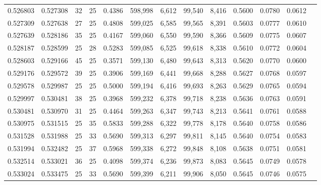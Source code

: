 \begin{tabular}{rrrrrrrrrrrrr}
0.526803 & 0.527308 &    32 &  25 &                                     0.4386 & 598,998 &   6,612 &  99,540 &   8,416 & 0.5600 & 0.0780 & 0.0612 \\
0.527309 & 0.527638 &    27 &  25 &                                     0.4808 & 599,025 &   6,585 &  99,565 &   8,391 & 0.5603 & 0.0777 & 0.0610 \\
0.527639 & 0.528186 &    35 &  25 &                                     0.4167 & 599,060 &   6,550 &  99,590 &   8,366 & 0.5609 & 0.0775 & 0.0607 \\
0.528187 & 0.528599 &    25 &  28 &                                     0.5283 & 599,085 &   6,525 &  99,618 &   8,338 & 0.5610 & 0.0772 & 0.0604 \\
0.528603 & 0.529166 &    45 &  25 &                                     0.3571 & 599,130 &   6,480 &  99,643 &   8,313 & 0.5620 & 0.0770 & 0.0600 \\
0.529176 & 0.529572 &    39 &  25 &                                     0.3906 & 599,169 &   6,441 &  99,668 &   8,288 & 0.5627 & 0.0768 & 0.0597 \\
0.529578 & 0.529987 &    25 &  25 &                                     0.5000 & 599,194 &   6,416 &  99,693 &   8,263 & 0.5629 & 0.0765 & 0.0594 \\
0.529997 & 0.530481 &    38 &  25 &                                     0.3968 & 599,232 &   6,378 &  99,718 &   8,238 & 0.5636 & 0.0763 & 0.0591 \\
0.530481 & 0.530970 &    31 &  25 &                                     0.4464 & 599,263 &   6,347 &  99,743 &   8,213 & 0.5641 & 0.0761 & 0.0588 \\
0.530975 & 0.531515 &    25 &  35 &                                     0.5833 & 599,288 &   6,322 &  99,778 &   8,178 & 0.5640 & 0.0758 & 0.0586 \\
0.531528 & 0.531988 &    25 &  33 &                                     0.5690 & 599,313 &   6,297 &  99,811 &   8,145 & 0.5640 & 0.0754 & 0.0583 \\
0.531994 & 0.532482 &    25 &  37 &                                     0.5968 & 599,338 &   6,272 &  99,848 &   8,108 & 0.5638 & 0.0751 & 0.0581 \\
0.532514 & 0.533021 &    36 &  25 &                                     0.4098 & 599,374 &   6,236 &  99,873 &   8,083 & 0.5645 & 0.0749 & 0.0578 \\
0.533024 & 0.533475 &    25 &  33 &                                     0.5690 & 599,399 &   6,211 &  99,906 &   8,050 & 0.5645 & 0.0746 & 0.0575 \\

\end{tabular}
